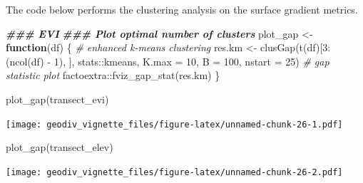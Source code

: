 \documentclass[
]{article}
\newenvironment{Shaded}{\begin{snugshade}}{\end{snugshade}}
\newcommand{\AttributeTok}[1]{\textcolor[rgb]{0.77,0.63,0.00}{#1}}
\newcommand{\CommentTok}[1]{\textcolor[rgb]{0.56,0.35,0.01}{\textit{#1}}}
\newcommand{\ControlFlowTok}[1]{\textcolor[rgb]{0.13,0.29,0.53}{\textbf{#1}}}
\newcommand{\DecValTok}[1]{\textcolor[rgb]{0.00,0.00,0.81}{#1}}
\newcommand{\DocumentationTok}[1]{\textcolor[rgb]{0.56,0.35,0.01}{\textbf{\textit{#1}}}}
\newcommand{\FunctionTok}[1]{\textcolor[rgb]{0.00,0.00,0.00}{#1}}
\newcommand{\NormalTok}[1]{#1}
\newcommand{\OtherTok}[1]{\textcolor[rgb]{0.56,0.35,0.01}{#1}}
\newcommand{\SpecialCharTok}[1]{\textcolor[rgb]{0.00,0.00,0.00}{#1}}
\begin{document}
The code below performs the clustering analysis on the surface gradient
metrics.

\begin{Shaded}
\begin{Highlighting}[]
\DocumentationTok{\#\#\# EVI}
\DocumentationTok{\#\#\# Plot optimal number of clusters}
\NormalTok{plot\_gap }\OtherTok{\textless{}{-}} \ControlFlowTok{function}\NormalTok{(df) \{}
  \CommentTok{\# enhanced k{-}means clustering}
\NormalTok{  res.km }\OtherTok{\textless{}{-}} \FunctionTok{clusGap}\NormalTok{(}\FunctionTok{t}\NormalTok{(df)[}\DecValTok{3}\SpecialCharTok{:}\NormalTok{(}\FunctionTok{ncol}\NormalTok{(df) }\SpecialCharTok{{-}} \DecValTok{1}\NormalTok{), ], stats}\SpecialCharTok{::}\NormalTok{kmeans, }\AttributeTok{K.max =} \DecValTok{10}\NormalTok{, }
                    \AttributeTok{B =} \DecValTok{100}\NormalTok{, }\AttributeTok{nstart =} \DecValTok{25}\NormalTok{)}
  \CommentTok{\# gap statistic plot}
\NormalTok{  factoextra}\SpecialCharTok{::}\FunctionTok{fviz\_gap\_stat}\NormalTok{(res.km)}
\NormalTok{\}}

\FunctionTok{plot\_gap}\NormalTok{(transect\_evi)}
\end{Highlighting}
\end{Shaded}

\texttt{[image: geodiv\_vignette\_files/figure-latex/unnamed-chunk-26-1.pdf]}

\begin{Shaded}
\begin{Highlighting}[]
\FunctionTok{plot\_gap}\NormalTok{(transect\_elev)}
\end{Highlighting}
\end{Shaded}

\texttt{[image: geodiv\_vignette\_files/figure-latex/unnamed-chunk-26-2.pdf]}
\end{document}
